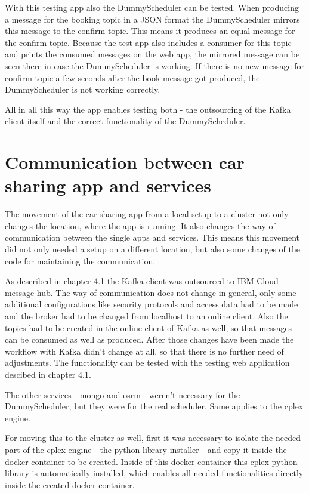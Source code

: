 With this testing app also the DummyScheduler can be tested. When producing a message for the booking topic in a JSON format the DummyScheduler mirrors this message to the confirm topic. This means it produces an equal message for the confirm topic. Because the test app also includes a consumer for this topic and prints the consumed messages on the web app, the mirrored message can be seen there in case the DummyScheduler is working. If there is no new message for confirm topic a few seconds after the book message got produced, the DummyScheduler is not working correctly.

All in all this way the app enables testing both - the outsourcing of the Kafka client itself and the correct functionality of the DummyScheduler.

\section{Communication between car sharing app and services}

The movement of the car sharing app from a local setup to a cluster not only changes the location, where the app is running. It also changes the way of communication between the single apps and services. This means this movement did not only needed a setup on a different location, but also some changes of the code for maintaining the communication. 

As described in chapter 4.1 the Kafka client was outsourced to IBM Cloud message hub. The way of communication does not change in general, only some additional configurations like security protocols and access data had to be made and the broker had to be changed from localhost to an online client. Also the topics had to be created in the online client of Kafka as well, so that messages can be consumed as well as produced. After those changes have been made the workflow with Kafka didn't change at all, so that there is no further need of adjustments. The functionality can be tested with the testing web application descibed in chapter 4.1.

The other services - mongo and osrm - weren't necessary for the DummyScheduler, but they were for the real scheduler. Same applies to the cplex engine.

For moving this to the cluster as well, first it was necessary to isolate the needed part of the cplex engine - the python library installer - and copy it inside the docker container to be created. Inside of this docker container this cplex python library is automatically installed, which enables all needed functionalities directly inside the created docker container.

